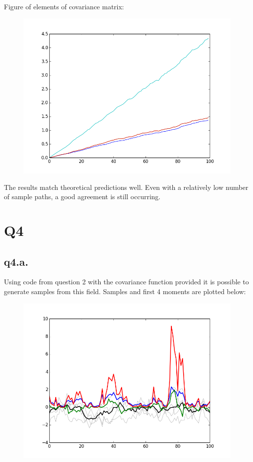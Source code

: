 \documentclass[11pt]{article} %
\begin{document}
Figure of elements of covariance matrix:
\begin{figure}[h!]
	\centering
		\includegraphics[scale = 0.5]{q3c3.png}
\end{figure}

The results match theoretical predictions well. Even with a relatively low number of sample paths, a good agreement is still occurring.

\section{Q4}
\subsection{q4.a.}
Using code from question 2 with the covariance function provided it is possible to generate samples from this field. Samples and first 4 moments are plotted below:

\begin{figure}[h!]
	\centering
		\includegraphics[scale = 0.5]{q4a2.png}
\end{figure}
\end{document}
